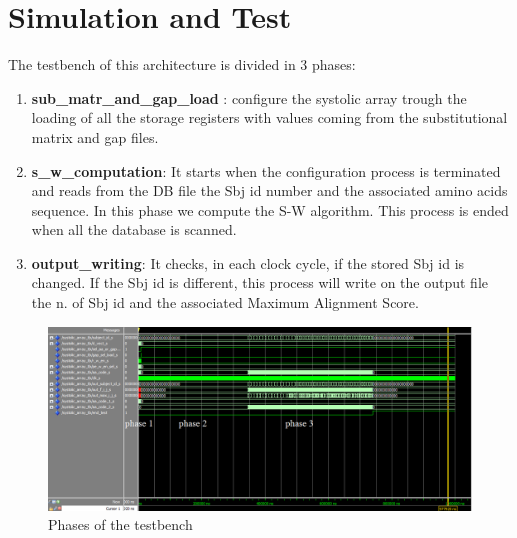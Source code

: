 \section{Simulation and Test}
The testbench of this architecture is divided in 3 phases:
\begin{enumerate}
	\item \textbf{sub\_matr\_and\_gap\_load }:  configure the systolic array trough the loading of all the storage registers with values coming from the substitutional matrix and gap files.\\
	\item  \textbf{s\_w\_computation}: It starts when the configuration process is terminated and reads from the DB file the Sbj id number and the associated amino acids sequence. In this phase we compute the S-W algorithm. This process is ended when all the database is scanned.\\
	\item \textbf{output\_writing}: It checks, in each clock cycle, if the stored Sbj id is changed. If the Sbj id is different, this process will write on the output file the n. of Sbj id and the associated Maximum Alignment Score.
	
	
	
\end{enumerate}
\begin{figure}[h!]
	\centering
	\includegraphics[width=\textwidth]{imm/sw/tb_systolic_array_phases.png} 	\caption{Phases of the testbench} 
	\label{tb_sw}
\end{figure}

